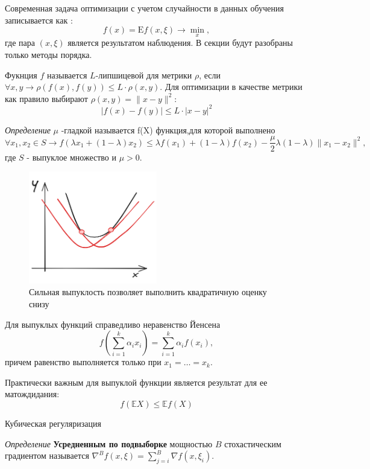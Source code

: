 Современная задача оптимизации с учетом
случайности в данных обучения записывается как \cite{nesterov2015universal}:
\begin{equation}
    f(x) = \mathrm{E} f(x,\xi) \rightarrow \min_x,
\end{equation}
где пара $(x,\xi)$ является результатом наблюдения.
В секции будут разобраны только методы порядка.

 Фукнция $f$ называется $L$-липшицевой для метрики $\rho$, 
если $\forall x,y \rightarrow \rho(f(x),f(y)) \le L \cdot \rho(x,y)$.
Для оптимизации в качестве метрики как правило выбирают $\rho(x,y) =\|x-y \|^2$:   
\begin{equation}
    |f(x) - f(y)| \le L \cdot |x-y|^2
\end{equation}

\textit{Определение} $\mu$ -гладкой называется f(X) функция,для которой выполнено \begin{equation}
   \forall x_1,x_2 \in S \rightarrow f(\lambda x_1 + (1-\lambda)x_2) \le \lambda f(x_1) + (1-\lambda) f(x_2) - \frac{\mu}{2} \lambda (1-\lambda) \| x_1 - x_2 \|^2,
\end{equation}
где $S$ - выпуклое множество и $\mu > 0$. 

\begin{figure}[h]
    \centering
    \includegraphics[width=0.5\textwidth]{assets/math/optimization/strong_convex.excalidraw.png}
    \caption{Сильная выпуклость позволяет выполнить квадратичную оценку снизу}
    \label{strong_convex}
\end{figure}

Для выпуклых функций справедливо неравенство Йенсена
\begin{equation}
    f \left( \sum_{i=1}^k \alpha_i x_i \right) = \sum_{i=1}^k \alpha_i f(x_i),
\end{equation}
причем равенство выполняется только при $x_1 = \dots =x_k$.

Практически важным для выпуклой функции является результат для ее матождидания:
\begin{equation}
    f(\mathbb{E} X) \le \mathbb{E} f(X)
\end{equation}

Кубическая регуляризация \cite{}

\textit{Определение} \textbf{Усредненным по подвыборке} мощностью $B$ стохастическим градиентом называется 
$\nabla^B f(x,\xi) = \sum_{j=i}^B \nabla f(x,\xi_i)$.

